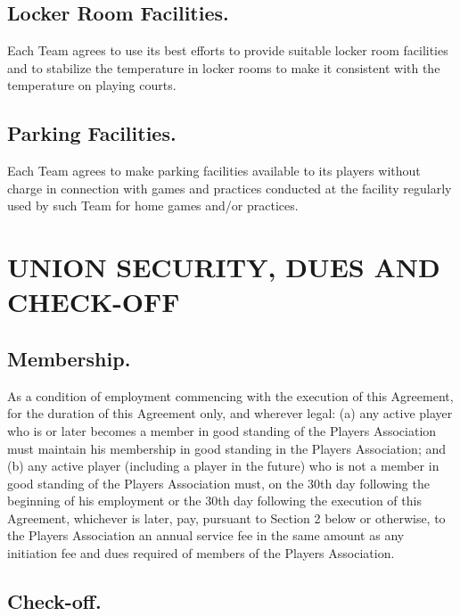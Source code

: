\documentclass[
]{book}
\begin{document}
\hypertarget{locker-room-facilities.}{%
\section{Locker Room Facilities.}\label{locker-room-facilities.}}

Each Team agrees to use its best efforts to provide suitable locker room facilities and to stabilize the temperature in locker rooms to make it consistent with the temperature on playing courts.

\hypertarget{parking-facilities.}{%
\section{Parking Facilities.}\label{parking-facilities.}}

Each Team agrees to make parking facilities available to its players without charge in connection with games and practices conducted at the facility regularly used by such Team for home games and/or practices.

\hypertarget{union-security-dues-and-check-off}{%
\chapter{UNION SECURITY, DUES AND CHECK-OFF}\label{union-security-dues-and-check-off}}

\hypertarget{membership.}{%
\section{Membership.}\label{membership.}}

As a condition of employment commencing with the execution of this Agreement, for the duration of this Agreement only, and wherever legal: (a) any active player who is or later becomes a member in good standing of the Players Association must maintain his membership in good standing in the Players Association; and (b) any active player (including a player in the future) who is not a member in good standing of the Players Association must, on the 30th day following the beginning of his employment or the 30th day following the execution of this Agreement, whichever is later, pay, pursuant to Section 2 below or otherwise, to the Players Association an annual service fee in the same amount as any initiation fee and dues required of members of the Players Association.

\hypertarget{check-off.}{%
\section{Check-off.}\label{check-off.}}
\end{document}
